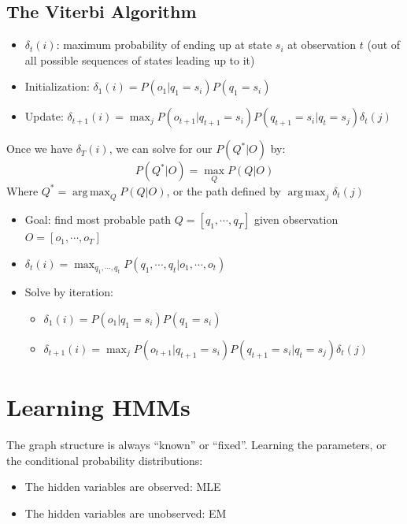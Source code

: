\documentclass[10pt]{article}
\DeclareMathOperator*{\argmax}{arg\,max}
\begin{document}
\subsection*{The Viterbi Algorithm}
\begin{itemize}
	\item $\delta_t(i)$: maximum probability of ending up at state $s_i$ at observation $t$ (out of all possible sequences of states leading up to it)
	\item Initialization: $\delta_1(i) = P(o_1 | q_1 = s_i) P(q_1 = s_i)$
	\item Update: $\delta_{t + 1}(i) = \max_j P(o_{t + 1} | q_{t + 1} = s_i) P(q_{t + 1} = s_i | q_t = s_j) \delta_t(j)$
\end{itemize}
Once we have $\delta_T(i)$, we can solve for our $P(Q^* | O)$ by:
\[P(Q^* | O) = \max_Q P(Q | O)\]
Where $Q^* = \argmax_Q P(Q | O)$, or the path defined by $\argmax_j \delta_t(j)$
\begin{itemize}
	\item Goal: find most probable path $Q = [q_1, \cdots, q_T]$ given observation $O = [o_1, \cdots, o_T]$
	\item $\delta_t(i) = \max_{q_1, \cdots, q_t} P(q_1, \cdots, q_t | o_1, \cdots, o_t)$
	\item Solve by iteration:
	\begin{itemize}
	    \item $\delta_1(i) = P(o_1 | q_1 = s_i) P(q_1 = s_i)$
	    \item $\delta_{t + 1}(i) = \max_j P(o_{t + 1} | q_{t + 1} = s_i) P(q_{t + 1} = s_i | q_t = s_j) \delta_t(j)$
    \end{itemize}
\end{itemize}

\section*{Learning HMMs}
The graph structure is always ``known'' or ``fixed''.  Learning the parameters, or the conditional probability distributions:
\begin{itemize}
	\item The hidden variables are observed: MLE
	\item The hidden variables are unobserved: EM
\end{itemize}
\end{document}
